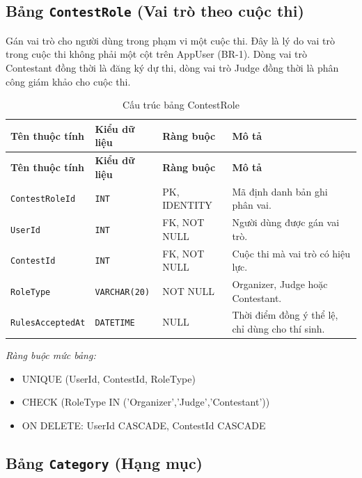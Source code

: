 \subsection{Bảng \texttt{ContestRole} (Vai trò theo cuộc thi)}

Gán vai trò cho người dùng trong phạm vi một cuộc thi. Đây là lý do vai trò trong cuộc thi không phải một cột trên AppUser (BR-1). Dòng vai trò Contestant đồng thời là đăng ký dự thi, dòng vai trò Judge đồng thời là phân công giám khảo cho cuộc thi.

\begin{longtable}{|L{4cm}|L{3.15cm}|L{2.4cm}|L{4.55cm}|}
\caption{Cấu trúc bảng ContestRole} \\
\hline
\textbf{Tên thuộc tính} & \textbf{Kiểu dữ liệu} & \textbf{Ràng buộc} & \textbf{Mô tả} \\ \hline
\endfirsthead
\hline
\textbf{Tên thuộc tính} & \textbf{Kiểu dữ liệu} & \textbf{Ràng buộc} & \textbf{Mô tả} \\ \hline
\endhead
\texttt{ContestRoleId} & \texttt{INT} & PK, IDENTITY & Mã định danh bản ghi phân vai. \\ \hline
\texttt{UserId} & \texttt{INT} & FK, NOT NULL & Người dùng được gán vai trò. \\ \hline
\texttt{ContestId} & \texttt{INT} & FK, NOT NULL & Cuộc thi mà vai trò có hiệu lực. \\ \hline
\texttt{RoleType} & \texttt{VARCHAR(20)} & NOT NULL & Organizer, Judge hoặc Contestant. \\ \hline
\texttt{RulesAcceptedAt} & \texttt{DATETIME} & NULL & Thời điểm đồng ý thể lệ, chỉ dùng cho thí sinh. \\ \hline
\end{longtable}

\noindent\textit{Ràng buộc mức bảng:}

\begin{itemize}\raggedright
    \item UNIQUE (UserId,\allowbreak{} ContestId,\allowbreak{} RoleType)
    \item CHECK (RoleType IN ('Organizer',\allowbreak{}'Judge',\allowbreak{}'Contestant'))
    \item ON DELETE: UserId CASCADE,\allowbreak{} ContestId CASCADE
\end{itemize}

\subsection{Bảng \texttt{Category} (Hạng mục)}

